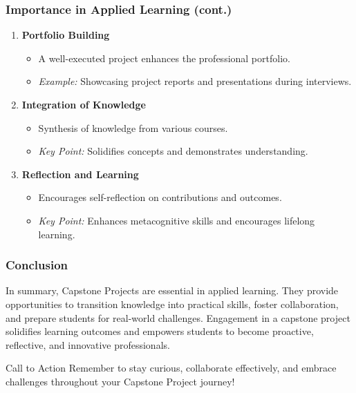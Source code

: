 \documentclass[aspectratio=169]{beamer}
\begin{document}
\begin{frame}[fragile]
    \frametitle{Importance in Applied Learning (cont.)}
    \begin{enumerate}[resume]
        \item \textbf{Portfolio Building}
            \begin{itemize}
                \item A well-executed project enhances the professional portfolio.
                \item \textit{Example:} Showcasing project reports and presentations during interviews.
            \end{itemize}
        \item \textbf{Integration of Knowledge}
            \begin{itemize}
                \item Synthesis of knowledge from various courses.
                \item \textit{Key Point:} Solidifies concepts and demonstrates understanding.
            \end{itemize}
        \item \textbf{Reflection and Learning}
            \begin{itemize}
                \item Encourages self-reflection on contributions and outcomes.
                \item \textit{Key Point:} Enhances metacognitive skills and encourages lifelong learning.
            \end{itemize}
    \end{enumerate}
\end{frame}

\begin{frame}[fragile]
    \frametitle{Conclusion}
    In summary, Capstone Projects are essential in applied learning. They provide opportunities to transition knowledge into practical skills, foster collaboration, and prepare students for real-world challenges. Engagement in a capstone project solidifies learning outcomes and empowers students to become proactive, reflective, and innovative professionals.
    
    \begin{block}{Call to Action}
        Remember to stay curious, collaborate effectively, and embrace challenges throughout your Capstone Project journey!
    \end{block}
\end{frame}
\end{document}
